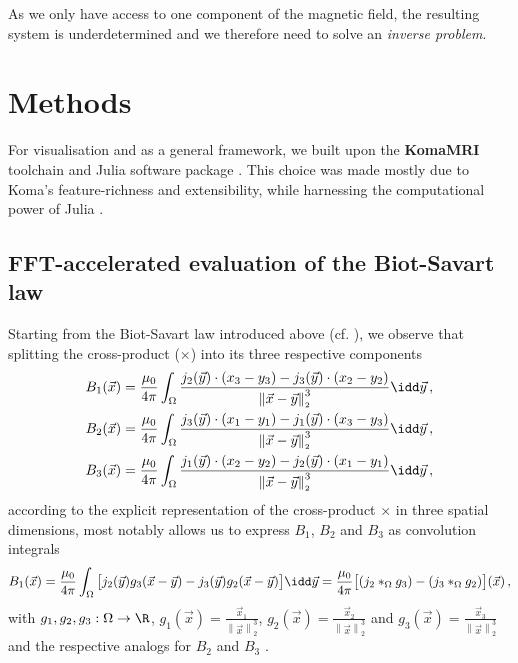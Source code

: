 \documentclass[12pt]{article}
\renewcommand{\norm}[1]{\left\lVert#1\right\rVert_{\scriptscriptstyle 2}}
\begin{document}
  As we only have access to one component of the magnetic field, the resulting system is underdetermined and we therefore need to solve an \textit{inverse problem}.

  \section{Methods}
  For visualisation and as a general framework, we built upon the \textbf{KomaMRI} toolchain and Julia software package \parencite{2022-koma-mri}.
  This choice was made mostly due to Koma's feature-richness and extensibility, while harnessing the computational power of Julia \parencite{2017-julia}.

  \subsection{FFT-accelerated evaluation of the Biot-Savart law}
  \label{sec:fft-biot}
  Starting from the Biot-Savart law introduced above (cf. ), we observe that splitting the cross-product ($\times$) into its three respective components
  \begin{align*}
    B_1(\vec{x}) & = \frac{\mu_0}{4\pi} \int_{\Omega} \frac{j_2(\vec{y}) \cdot (x_3 - y_3) - j_3(\vec{y}) \cdot (x_2 - y_2)}{\norm{\vec{x} - \vec{y}}^3} \idd\vec{y} \,, \\
    B_2(\vec{x}) & = \frac{\mu_0}{4\pi} \int_{\Omega} \frac{j_3(\vec{y}) \cdot (x_1 - y_1) - j_1(\vec{y}) \cdot (x_3 - y_3)}{\norm{\vec{x} - \vec{y}}^3} \idd\vec{y} \,, \\
    B_3(\vec{x}) & = \frac{\mu_0}{4\pi} \int_{\Omega} \frac{j_1(\vec{y}) \cdot (x_2 - y_2) - j_2(\vec{y}) \cdot (x_1 - y_1)}{\norm{\vec{x} - \vec{y}}^3} \idd\vec{y} \,,
  \end{align*}
  according to the explicit representation of the cross-product $\times$ in three spatial dimensions, most notably allows us to express $B_1$, $B_2$ and $B_3$ as convolution integrals
  $$B_1(\vec{x}) = \frac{\mu_0}{4\pi} \int_{\Omega} \big[j_2(\vec{y}) g_3(\vec{x} - \vec{y}) - j_3(\vec{y}) g_2(\vec{x} - \vec{y})\big]\idd\vec{y} = \frac{\mu_0}{4\pi} \big[(j_2 *_{\Omega} g_3) - (j_3 *_{\Omega} g_2)\big](\vec{x})\,,$$
  with $g_1, g_2, g_3: \Omega \to \R$, $g_1(\vec{x}) = \frac{\vec{x}_1}{\norm{\vec{x}}^3}$, $g_2(\vec{x}) = \frac{\vec{x}_2}{\norm{\vec{x}}^3}$ and $g_3(\vec{x}) = \frac{\vec{x}_3}{\norm{\vec{x}}^3}$ and the respective analogs for $B_2$ and $B_3$ \parencite{2020-biot-savart-evaluation-fft}.
\end{document}
